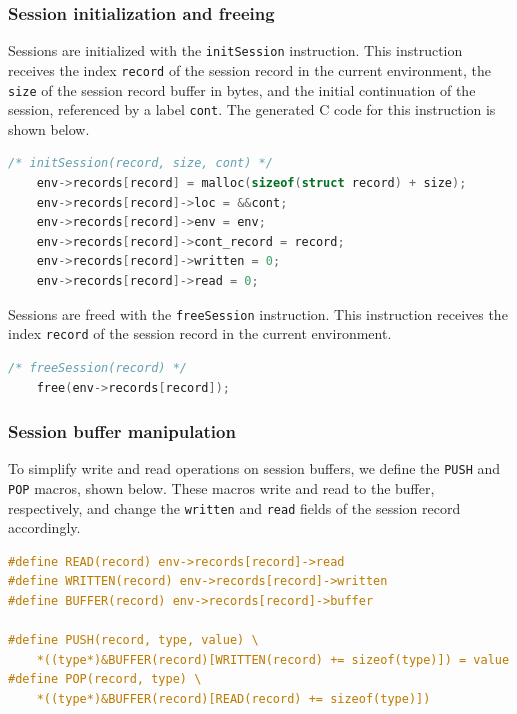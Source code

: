 \subsubsection{Session initialization and freeing}

Sessions are initialized with the \texttt{initSession} instruction. This instruction receives the index \texttt{record} of the session record in the current environment, the \texttt{size} of the session record buffer in bytes, and the initial continuation of the session, referenced by a label \texttt{cont}. The generated C code for this instruction is shown below.

\begin{lstlisting}[language=C]
    /* initSession(record, size, cont) */
    env->records[record] = malloc(sizeof(struct record) + size);
    env->records[record]->loc = &&cont;
    env->records[record]->env = env;
    env->records[record]->cont_record = record;
    env->records[record]->written = 0;
    env->records[record]->read = 0;
\end{lstlisting}

Sessions are freed with the \texttt{freeSession} instruction. This instruction receives the index \texttt{record} of the session record in the current environment.

\begin{lstlisting}[language=C]
    /* freeSession(record) */
    free(env->records[record]);
\end{lstlisting}

\subsubsection{Session buffer manipulation}

To simplify write and read operations on session buffers, we define the \texttt{PUSH} and \texttt{POP} macros, shown below. These macros write and read to the buffer, respectively, and change the \texttt{written} and \texttt{read} fields of the session record accordingly.

\begin{lstlisting}[language=C]
#define READ(record) env->records[record]->read
#define WRITTEN(record) env->records[record]->written
#define BUFFER(record) env->records[record]->buffer

#define PUSH(record, type, value) \
    *((type*)&BUFFER(record)[WRITTEN(record) += sizeof(type)]) = value
#define POP(record, type) \
    *((type*)&BUFFER(record)[READ(record) += sizeof(type)])
\end{lstlisting}

